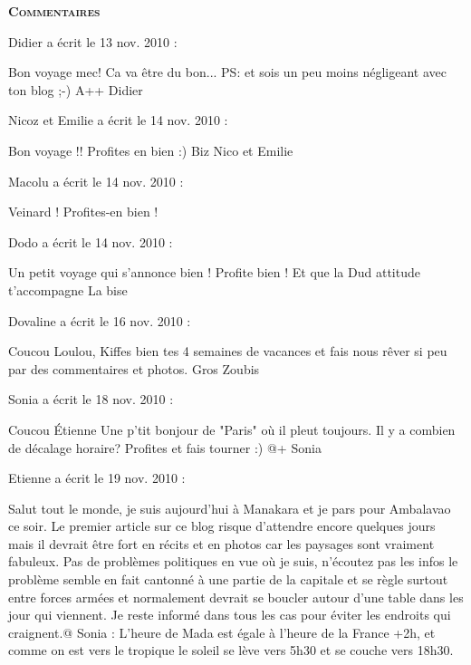 \bigskip
\textbf{\textsc{Commentaires}}

 \medskip
Didier a écrit le 13 nov. 2010 :
\begin{displayquote}
Bon voyage mec! Ca va être du bon...
PS: et sois un peu moins négligeant avec ton blog ;-)
A++
Didier
\end{displayquote}

 \medskip
Nicoz et Emilie a écrit le 14 nov. 2010 :
\begin{displayquote}
Bon voyage !!
Profites en bien :)
Biz
Nico et Emilie
\end{displayquote}

 \medskip
Macolu a écrit le 14 nov. 2010 :
\begin{displayquote}
Veinard ! Profites-en bien !
\end{displayquote}

 \medskip
Dodo a écrit le 14 nov. 2010 :
\begin{displayquote}
Un petit voyage qui s'annonce bien ! Profite bien !
Et que la Dud attitude t'accompagne
La bise
\end{displayquote}

 \medskip
Dovaline a écrit le 16 nov. 2010 :
\begin{displayquote}
Coucou Loulou,
Kiffes bien tes 4 semaines de vacances et fais nous rêver si peu par des commentaires et photos.
Gros Zoubis
\end{displayquote}

 \medskip
Sonia a écrit le 18 nov. 2010 :
\begin{displayquote}
Coucou Étienne
Une p'tit bonjour de "Paris" où il pleut toujours.
Il y a combien de décalage horaire?
Profites et fais tourner :)
@+
Sonia
\end{displayquote}

 \medskip
Etienne a écrit le 19 nov. 2010 :
\begin{displayquote}
Salut tout le monde, je suis aujourd'hui à Manakara et je pars pour Ambalavao ce soir. Le premier article sur ce blog risque d'attendre encore quelques jours mais il devrait être fort en récits et en photos car les paysages sont vraiment fabuleux. Pas de problèmes politiques en vue où je suis, n'écoutez pas les infos le problème semble en fait cantonné à une partie de la capitale et se règle surtout entre forces armées et normalement devrait se boucler autour d'une table dans les jour qui viennent. Je reste informé dans tous les cas pour éviter les endroits qui craignent.@ Sonia : L'heure de Mada est égale à l'heure de la France +2h, et comme on est vers le tropique le soleil se lève vers 5h30 et se couche vers 18h30.
\end{displayquote}

